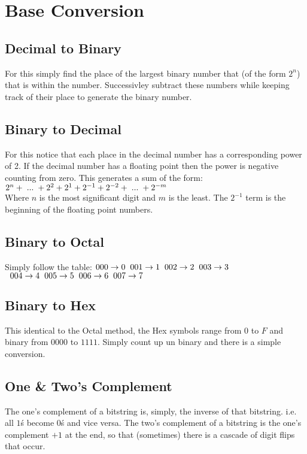 \section{Base Conversion}
\subsection*{Decimal to Binary}
For this simply find the place of the largest binary number that (of the form $2^n$)
that is within the number. Successivley subtract these numbers while keeping track of their
place to generate the binary number.

\subsection*{Binary to Decimal}
For this notice that each place in the decimal number has a
corresponding power of 2. If the decimal number has a floating
point then the power is negative counting from zero. This generates a
sum of the form:\\
$ 2^{n} + \hspace{1mm} ... \hspace{1mm} + 2^2 + 2^1 + 2^{-1} + 2^{-2} + \hspace{1mm} ... \hspace{1mm} + 2^{-m} $\\
Where $n$ is the most significant digit and $m$ is the least. The $2^{-1}$ term
is the beginning of the floating point numbers.

\subsection*{Binary to Octal}
Simply follow the table:
$ 000 \rightarrow 0 \hspace{2mm} 001 \rightarrow 1 \hspace{2mm} 002 \rightarrow 2 \hspace{2mm} 003 \rightarrow 3 $
$ \hspace{2mm} 004 \rightarrow 4 \hspace{2mm} 005 \rightarrow 5 \hspace{2mm} 006 \rightarrow 6 \hspace{2mm} 007 \rightarrow 7 $\\

\subsection*{Binary to Hex}
This identical to the Octal method, the Hex symbols range from $0$ to $F$ and binary
from $0000$ to $1111$. Simply count up un binary and there is a simple conversion.

\subsection*{One \& Two's Complement}
The one's complement of a bitstring is, simply, the inverse of that bitstring.
i.e. all $1$\'s become $0$\'s and vice versa. The two's complement of a bitstring
is the one's complement $+1$ at the end, so that (sometimes) there is a cascade
of digit flips that occur. 
